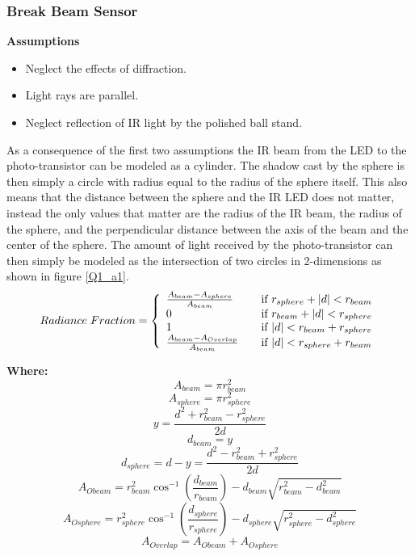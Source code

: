 \documentclass{article}
\theoremstyle{plain}
\theoremstyle{definition}
\theoremstyle{remark}
\begin{document}
\subsubsection*{Break Beam Sensor}

\textbf{Assumptions} 
\begin{itemize}
\item Neglect the effects of diffraction.
\item Light rays are parallel. 
\item Neglect reflection of IR light by the polished ball stand.
\end{itemize}
As a consequence of the first two assumptions the IR beam from the LED to the photo-transistor can be modeled as a cylinder.  The shadow cast by the sphere is then simply a circle with radius equal to the radius of the sphere itself.  This also means that the distance between the sphere and the IR LED does not matter, instead the only values that matter are the radius of the IR beam, the radius of the sphere, and the perpendicular distance between the axis of the beam and the center of the sphere.  The amount of light received by the photo-transistor can then simply be modeled as the intersection of two circles in 2-dimensions as shown in figure \ref{Q1_a1}. \\

\[
  Radiance \hspace{0.1cm} Fraction = \left\{
  \begin{array}{l l}
    \frac{A_{beam} - A_{sphere}}{A_{beam}} & \quad \text{if } r_{sphere} + |d| < r_{beam} \\
    0 & \quad \text{if } r_{beam} + |d| < r_{sphere} \\
    1 & \quad \text{if } |d| < r_{beam} + r_{sphere} \\
    \frac{A_{beam} - A_{Overlap}}{A_{beam}} & \quad \text{if } |d| < r_{sphere} + r_{beam} \\
  \end{array} \right.
\]

\textbf{Where:}
$$ A_{beam} = \pi r_{beam}^2$$
$$A_{sphere} = \pi r_{sphere}^2 $$ 
$$ y = \frac{d^2+r_{beam}^2-r_{sphere}^2}{2d}$$
$$ d_{beam}=y$$
$$ d_{sphere}=d-y=\frac{d^2-r_{beam}^2+r_{sphere}^2}{2d} $$
$$ A_{Obeam} = r_{beam}^2 \cos^{-1} (\frac{d_{beam}}{r_{beam}})-d_{beam} \sqrt{r_{beam}^2-d_{beam}^2}$$ 
$$ A_{Osphere} = r_{sphere}^2 \cos^{-1} (\frac{d_{sphere}}{r_{sphere}})-d_{sphere} \sqrt{r_{sphere}^2-d_{sphere}^2}$$
$$ A_{Overlap} = A_{Obeam} + A_{Osphere} $$
\end{document}
